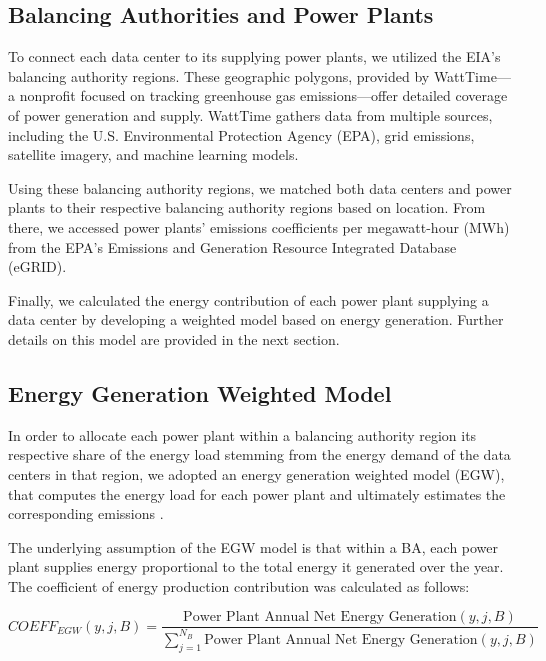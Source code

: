 \documentclass[12pt]{article}
\begin{document}
\subsection{Balancing Authorities and Power Plants}

To connect each data center to its supplying power plants, we utilized the EIA's balancing authority regions. These geographic polygons, provided by WattTime—a nonprofit focused on tracking greenhouse gas emissions—offer detailed coverage of power generation and supply. WattTime gathers data from multiple sources, including the U.S. Environmental Protection Agency (EPA), grid emissions, satellite imagery, and machine learning models.

Using these balancing authority regions, we matched both data centers and power plants to their respective balancing authority regions based on location. From there, we accessed power plants' emissions coefficients per megawatt-hour (MWh) from the EPA's Emissions and Generation Resource Integrated Database (eGRID).

Finally, we calculated the energy contribution of each power plant supplying a data center by developing a weighted model based on energy generation. Further details on this model are provided in the next section. 

\subsection{Energy Generation Weighted Model}


In order to allocate each power plant within a balancing authority region its respective share of the energy load stemming from the energy demand of the data centers in that region, we adopted an energy generation weighted model (EGW), that computes the energy load for each power plant and ultimately estimates the corresponding emissions \cite{ekvall2005normative,nordenstam2021attributional, rehl2012life}. 

The underlying assumption of the EGW model is that within a BA, each power plant supplies energy proportional to the total energy it generated over the year. The coefficient of energy production contribution was calculated as follows:

\begin{equation}
COEFF_{EGW}(y, j, B) = \frac{\text{Power Plant Annual Net Energy Generation}(y, j, B)}{\sum_{j=1}^{N_B} \text{Power Plant Annual Net Energy Generation}(y, j, B)}
\end{equation}
\end{document}
